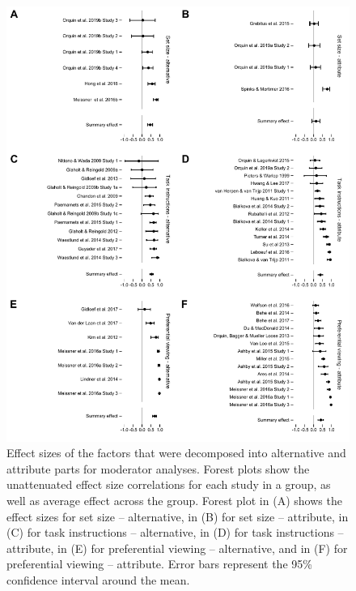 \documentclass[english,natbib,man,floatsintext]{apa6}
\begin{document}
\begin{figure}%
\includegraphics{forest_plots_altatt}
\centering
\singlespace
\caption{Effect sizes of the factors that were decomposed into alternative and attribute parts for moderator analyses. Forest plots show the unattenuated effect size correlations for each study in a group, as well as average effect across the group. Forest plot in (A) shows the effect sizes for set size -- alternative, in (B) for set size -- attribute, in (C) for task instructions -- alternative, in (D) for task instructions -- attribute, in (E) for preferential viewing -- alternative, and in (F) for preferential viewing -- attribute. Error bars represent the 95\% confidence interval around the mean.}
\label{fig:forest_plots_altatt}
\end{figure}
\clearpage
\end{document}
